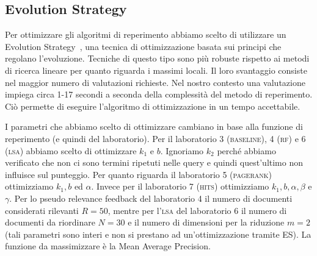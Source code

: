 \subsection{Evolution Strategy}
\label{sec:es}

Per ottimizzare gli algoritmi di reperimento abbiamo scelto di utilizzare un Evolution Strategy~\cite{back1996evolutionary}, una tecnica di ottimizzazione basata sui principi che regolano l'evoluzione. Tecniche di questo tipo sono pi\`u robuste rispetto ai metodi di ricerca lineare per quanto riguarda i massimi locali. Il loro svantaggio consiste nel maggior numero di valutazioni richieste. Nel nostro contesto una valutazione impiega circa 1-17 secondi a seconda della complessit\`a del metodo di reperimento. Ci\`o permette di eseguire l'algoritmo di ottimizzazione in un tempo accettabile.

I parametri che abbiamo scelto di ottimizzare cambiano in base alla funzione di reperimento (e quindi del laboratorio). Per il laboratorio 3 (\textsc{baseline}), 4 (\textsc{rf}) e 6 (\textsc{lsa}) abbiamo scelto di ottimizzare $k_1$ e $b$. Ignoriamo $k_2$ perch\'e abbiamo verificato che non ci sono termini ripetuti nelle query e quindi  quest'ultimo non influisce sul punteggio. Per quanto riguarda il laboratorio 5 (\textsc{pagerank}) ottimizziamo $k_1, b$ ed $\alpha$. Invece per il laboratorio 7 (\textsc{hits}) ottimizziamo $k_1, b, \alpha, \beta$ e $\gamma$. Per lo pseudo relevance feedback del laboratorio 4 il numero di documenti considerati rilevanti $R = 50$, mentre per l'\textsc{lsa} del laboratorio 6 il numero di documenti da riordinare $N = 30$ e il numero di dimensioni per la riduzione $m=2$ (tali parametri sono interi e non si prestano ad un'ottimizzazione tramite ES). La funzione da massimizzare \`e la Mean Average Precision.

